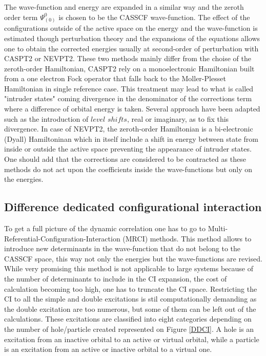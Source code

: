 \documentclass[10pt]{report}
\numberwithin{equation}{section}
\begin{document}
The wave-function and energy are expanded in a similar way and the zeroth order term $\Psi_{(0)}^{0}$ is chosen to be the CASSCF wave-function. 
The effect of the configurations outside of the active space on the energy and the wave-function is estimated though perturbation theory and the expansions of the equations allows one to obtain the corrected energies
usually at second-order of perturbation with CASPT2 or NEVPT2. These two methods mainly differ from the choise of the zeroth-order Hamiltonian, CASPT2 rely on a monoelectronic Hamiltonian built from a one electron Fock operator that falls back to the Moller-Plesset Hamiltonian in single reference case. 
This treatment may lead to what is called "intruder states" coming divergence in the denominator of the corrections term where a difference of orbital energy is taken. Several approach have been adapted such as the introduction of  $level$ $shifts$, real or imaginary, as to fix this divergence.
In case of NEVPT2, the zeroth-order Hamiltonian is a bi-electronic (Dyall) Hamiltoninan which in itself include a shift in energy between state from inside or outside the active space preventing the appearance of intruder states.
One should add that the corrections are considered to be contracted as these methods do not act upon the coefficients inside the wave-functions but only on the energies.

\subsection{Difference dedicated configurational interaction}

To get a full picture of the dynamic correlation one has to go to Multi-Referential-Configuration-Interaction (MRCI) methods.
This method allows to introduce new determinants in the wave-function that do not belong to the CASSCF space, this way not only the energies but the wave-functions are revised.
While very promising this method is not applicable to large systems because of the number of determinants to include in the CI expansion, the cost of calculation becoming too high, one has to truncate the CI space.
Restricting the CI to all the simple and double excitations is stil computationally demanding as the double excitation are too numerous, but some of them can be left out of the calculations. 
These excitations are classified into eight categories depending on the number of hole/particle created represented on Figure \ref{DDCI}. 
A hole is an excitation from an inactive orbital to an active or virtual orbital, while a particle is an excitation from an active or inactive orbital to a virtual one.
\end{document}
